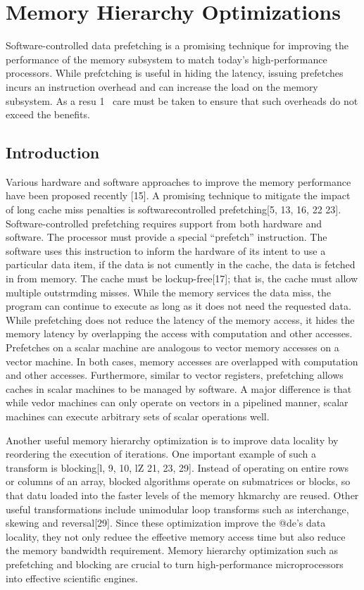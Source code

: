 \newpage 

\section{Memory Hierarchy Optimizations}

Software-controlled data prefetching is a promising technique for
improving the performance of the memory subsystem to match
today’s high-performance processors. While prefctching is useful in
hiding the latency, issuing prefetches incurs an instruction overhead
and can increase the load on the memory subsystem. As a resu 1~
care must be taken to ensure that such overheads do not exceed the
benefits.


\subsection{Introduction}

Various hardware and software approaches to improve the memory
performance have been proposed recently [15]. A promising technique 
to mitigate the impact of long cache miss penalties is softwarecontrolled
 prefetching[5, 13, 16, 22 23]. Software-controlled
prefetching\cite{mowry1992design} requires support from both hardware and software. The
processor must provide a special “prefetch” instruction. The software 
uses this instruction to inform the hardware of its intent
to use a particular data item, if the data is not cumently in the
cache, the data is fetched in from memory. The cache must be
lockup-free[17]; that is, the cache must allow multiple outstrmding
 misses. While the memory services the data miss, the program
can continue to execute as long as it does not need the requested
data. While prefetching does not reduce the latency of the memory
access, it hides the memory latency by overlapping the access with
computation and other accesses. Prefetches on a scalar machine
are analogous to vector memory accesses on a vector machine. In
both cases, memory accesses are overlapped with computation and
other accesses. Furthermore, similar to vector registers, prefetching
allows caches in scalar machines to be managed by software. A
major difference is that while vedor machines can only operate on
vectors in a pipelined manner, scalar machines can execute arbitrary
sets of scalar operations well.


Another useful memory hierarchy optimization is to improve data
locality by reordering the execution of iterations. One important
example of such a transform is blocking[l, 9, 10, lZ 21, 23, 29].
Instead of operating on entire rows or columns of an array, blocked
algorithms operate on submatrices or blocks, so that datu loaded
into the faster levels of the memory hkmarchy are reused. Other
useful transformations include unimodular loop transforms such as
interchange, skewing and reversal[29]. Since these optimization
improve the @de’s data locality, they not only reduee the effeetive
 memory access time but also reduce the memory bandwidth
requirement. Memory hierarchy optimization such as prefetching
and blocking are crucial to turn high-performance microprocessors
into effective scientific engines.




